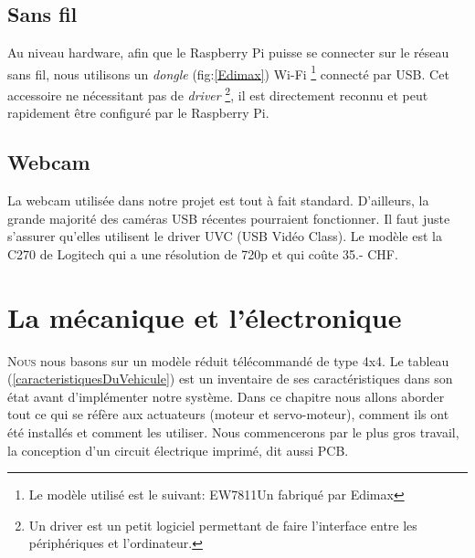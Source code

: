 \documentclass[a4paper,11pt]{report}
\begin{document}
{\section{Sans fil}

Au niveau hardware, afin que le Raspberry Pi puisse se connecter sur le réseau
sans fil, nous utilisons un \textit{dongle} (fig:\ref{Edimax})
Wi-Fi \footnote{Le modèle utilisé est le suivant: EW7811Un fabriqué par
  Edimax} connecté par USB. Cet accessoire ne nécessitant pas de \textit{driver} \footnote{Un
  driver est un petit logiciel permettant de faire l'interface entre les
  périphériques et l'ordinateur.}, il est directement reconnu et peut rapidement être configuré par le Raspberry Pi. 

\section{Webcam}

La webcam utilisée dans notre projet est tout à fait standard. D'ailleurs, la grande majorité des caméras USB récentes pourraient fonctionner. Il faut juste s'assurer qu'elles utilisent le driver UVC (USB Vidéo Class)\cite{uvc}. Le modèle est la C270 de Logitech qui a une résolution de 720p et qui coûte 35.- CHF.

\chapter{La mécanique et l'électronique}


\lettrine{N}{ous} nous basons sur un modèle réduit
télécommandé de type 4x4. Le tableau (\ref{caracteristiquesDuVehicule}) est un
inventaire de ses caractéristiques dans son état avant d'implémenter notre système. Dans ce chapitre nous
allons aborder tout ce qui se réfère aux actuateurs (moteur et servo-moteur),
comment ils ont été installés et comment les utiliser. Nous commencerons par
le plus gros travail, la conception d'un circuit électrique imprimé, dit aussi PCB. 

}
\end{document}
